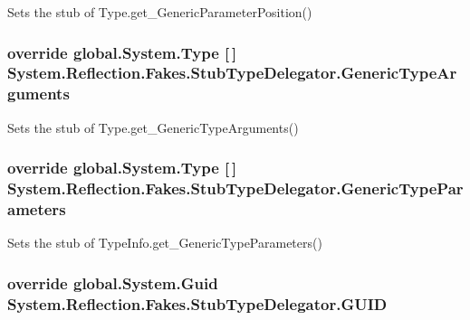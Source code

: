 Sets the stub of Type.\-get\-\_\-\-Generic\-Parameter\-Position()

\hypertarget{class_system_1_1_reflection_1_1_fakes_1_1_stub_type_delegator_a816da5c436d01e2d28e4451a4c4b37bd}{
\subsubsection[{Generic\-Type\-Arguments}]{\setlength{\rightskip}{0pt plus 5cm}override global.\-System.\-Type \mbox{[}$\,$\mbox{]} System.\-Reflection.\-Fakes.\-Stub\-Type\-Delegator.\-Generic\-Type\-Arguments\hspace{0.3cm}{\ttfamily [get]}}}\label{class_system_1_1_reflection_1_1_fakes_1_1_stub_type_delegator_a816da5c436d01e2d28e4451a4c4b37bd}


Sets the stub of Type.\-get\-\_\-\-Generic\-Type\-Arguments()

\hypertarget{class_system_1_1_reflection_1_1_fakes_1_1_stub_type_delegator_a08d275018445d5eb52380e2d9d6560fc}{
\subsubsection[{Generic\-Type\-Parameters}]{\setlength{\rightskip}{0pt plus 5cm}override global.\-System.\-Type \mbox{[}$\,$\mbox{]} System.\-Reflection.\-Fakes.\-Stub\-Type\-Delegator.\-Generic\-Type\-Parameters\hspace{0.3cm}{\ttfamily [get]}}}\label{class_system_1_1_reflection_1_1_fakes_1_1_stub_type_delegator_a08d275018445d5eb52380e2d9d6560fc}


Sets the stub of Type\-Info.\-get\-\_\-\-Generic\-Type\-Parameters()

\hypertarget{class_system_1_1_reflection_1_1_fakes_1_1_stub_type_delegator_ab94c07cb97693a1980b5ee96e26f8f13}{
\subsubsection[{G\-U\-I\-D}]{\setlength{\rightskip}{0pt plus 5cm}override global.\-System.\-Guid System.\-Reflection.\-Fakes.\-Stub\-Type\-Delegator.\-G\-U\-I\-D\hspace{0.3cm}{\ttfamily [get]}}}\label{class_system_1_1_reflection_1_1_fakes_1_1_stub_type_delegator_ab94c07cb97693a1980b5ee96e26f8f13}


